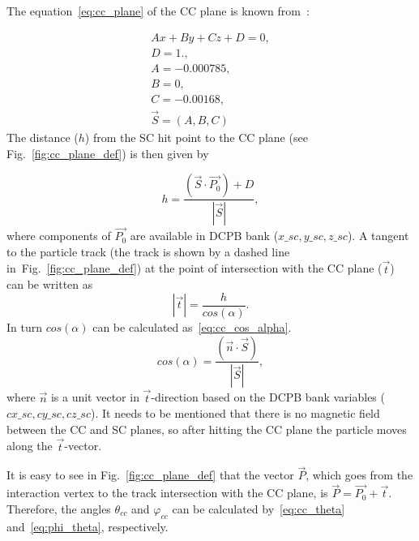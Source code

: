  
The equation~\ref{eq:cc_plane} of the CC plane is known from~\cite{Osipenko:2004}: 

\begin{equation}
\begin{aligned}
 Ax+By+Cz+D = 0,  \\ \label{eq:cc_plane}
  D=1.,  \\ 
  A=-0.000785, \\ 
  B=0,  \\
  C=-0.00168, \\
  \overrightarrow{S} = (A,B,C)
\end{aligned}  
\end{equation}
The distance ($h$) from the SC hit point to the CC plane (see Fig.~\ref{fig:cc_plane_def}) is then given by

\begin{equation}
h=\frac{(\overrightarrow{S} \cdot \overrightarrow{P_{0}})+D}{\left |\overrightarrow{S}  \right |},
\label{eq:cc_h_distance}
\end{equation}
where components of $\overrightarrow{P_{0}}$ are available in  DCPB bank ($x\_sc, y\_sc, z\_sc$). 
 A tangent to the particle track (the track is shown by a dashed line in~Fig.~\ref{fig:cc_plane_def})  at the point of intersection with the CC plane ($ \vec t$) can be written as 
\begin{equation}
\left | \overrightarrow{t} \right |=\frac{h}{cos(\alpha )}.
\label{eq:cc_t_vec} 
\end{equation}
In turn $cos(\alpha )$ can be calculated as~\ref{eq:cc_cos_alpha}.
\begin{equation}
cos(\alpha )=\frac{(\overrightarrow{n} \cdot \overrightarrow{S})}{\left | \overrightarrow{S} \right |},
\label{eq:cc_cos_alpha} 
\end{equation}
 where $ \vec n$ is a unit vector in $ \vec t$-direction based on the DCPB bank variables ($cx\_sc, cy\_sc, cz\_sc$). It needs to be mentioned that there is no magnetic field between the CC and SC planes, so after hitting the CC plane the particle moves along the $ \vec t$-vector.






It is easy to see in Fig.~\ref{fig:cc_plane_def} that the vector $\overrightarrow{P}$, which goes from the  interaction vertex to the track intersection with the CC plane, is $\overrightarrow{P}=\overrightarrow{P_{0}}+\overrightarrow{t}$. Therefore, the angles $\theta_{cc}$ and $\varphi_{cc}$ can be calculated by~\ref{eq:cc_theta} and~\ref{eq:phi_theta}, respectively.


